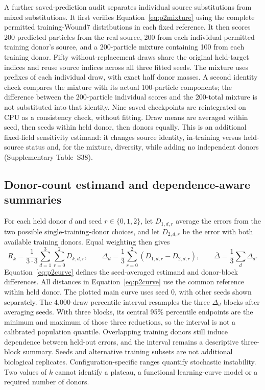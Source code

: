 \documentclass[10pt,a4paper]{article}
\begin{document}
A further saved-prediction audit separates individual source substitutions from mixed substitutions. It first verifies Equation~\eqref{eq:p2mixture} using the complete permitted training-Wound7 distributions in each fixed reference. It then scores 200 predicted particles from the real source, 200 from each individual permitted training donor's source, and a 200-particle mixture containing 100 from each training donor. Fifty without-replacement draws share the original held-target indices and reuse source indices across all three fitted seeds. The mixture uses prefixes of each individual draw, with exact half donor masses. A second identity check compares the mixture with its actual 100-particle components; the difference between the 200-particle individual scores and the 200-total mixture is not substituted into that identity. Nine saved checkpoints are reintegrated on CPU as a consistency check, without fitting. Draw means are averaged within seed, then seeds within held donor, then donors equally. This is an additional fixed-field sensitivity estimand: it changes source identity, in-training versus held-source status and, for the mixture, diversity, while adding no independent donors (Supplementary Table~S38).

\subsection{Donor-count estimand and dependence-aware summaries}
For each held donor $d$ and seed $r\in\{0,1,2\}$, let $D_{1,d,r}$ average the errors from the two possible single-training-donor choices, and let $D_{2,d,r}$ be the error with both available training donors. Equal weighting then gives
\begin{equation}
R_k=\frac1{3\cdot3}\sum_{d=1}^{3}\sum_{r=0}^{2}D_{k,d,r},\qquad
\Delta_d=\frac13\sum_{r=0}^{2}(D_{1,d,r}-D_{2,d,r}),\qquad
\overline\Delta=\frac13\sum_d\Delta_d.\label{eq:p2curve}
\end{equation}
Equation~\eqref{eq:p2curve} defines the seed-averaged estimand and donor-block differences. All distances in Equation~\eqref{eq:p2curve} use the common reference within held donor. The plotted main curve uses seed 0, with other seeds shown separately. The 4,000-draw percentile interval resamples the three $\Delta_d$ blocks after averaging seeds. With three blocks, its central 95\% percentile endpoints are the minimum and maximum of those three reductions, so the interval is not a calibrated population quantile. Overlapping training donors still induce dependence between held-out errors, and the interval remains a descriptive three-block summary. Seeds and alternative training subsets are not additional biological replicates. Configuration-specific ranges quantify stochastic instability. Two values of $k$ cannot identify a plateau, a functional learning-curve model or a required number of donors.
\end{document}

